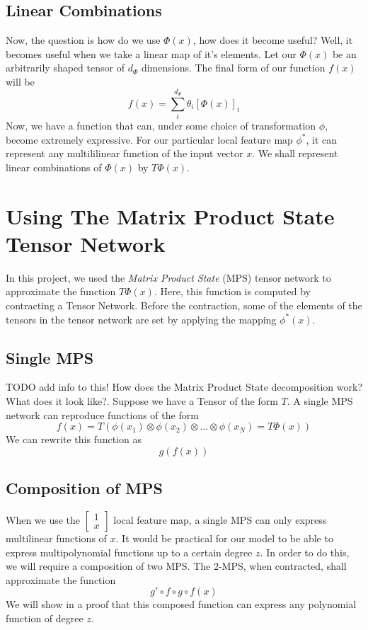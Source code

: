 \documentclass[11pt]{article}
\theoremstyle{definition}
\theoremstyle{definition}
\begin{document}
\subsection{Linear Combinations}
Now, the question is how do we use $\Phi(x)$, how does it become useful? 
Well, it becomes useful when we take a linear map of it's elements. Let our $\Phi(x)$ be an 
arbitrarily shaped tensor of $d_{\Phi}$ dimensions. The final form of our 
function $f(x)$ will be
\begin{equation}
    f(x) = \sum_{i}^{d_{\Phi}} \theta_i [\Phi(x)]_i
\end{equation}
Now, we have a function that can, under some choice of transformation
$\phi$, become extremely expressive. For our particular local feature map 
$\phi^*$, it can represent any multililinear function  of the input vector $x$. 
We shall represent linear combinations of $\Phi(x)$ by $T\Phi(x)$.

\section{Using The Matrix Product State Tensor Network}
In this project, we used the {\it Matrix Product State} (MPS) tensor network to 
approximate the function $T  \Phi(x)$. Here, this function is computed by contracting 
a Tensor Network. Before the contraction, some of the elements of the tensors in the 
tensor network are set by applying the mapping $\phi^*(x)$.

\subsection{Single MPS}
TODO add info to this!
How does the Matrix Product State decomposition work? What does it look like?.
Suppose we have a Tensor of the form $T$.
A single MPS network can reproduce functions of the form 
\[  
    f(x) = T \left( 
            \phi(x_1) \otimes 
            \phi(x_2) \otimes 
            \dots \otimes 
            \phi(x_N) = T \Phi(x)
        \right)
\]
We can rewrite this function as
\[  
    g ( f ( x ) )
\]

\subsection{Composition of MPS}
When we use the $ \begin{bmatrix} 1 \\ x \end{bmatrix} $ local feature map, a single
MPS can only express multilinear functions of $x$. It would be practical 
for our model to be able to express multipolynomial functions up to a certain degree $z$.
In order to do this, we will require a composition of two MPS. The 2-MPS, when contracted,
shall approximate the function
\[  
    g' \circ f \circ g \circ f (x)
\]
We will show in a proof that this composed function can express any polynomial function of degree $z$.
\end{document}
